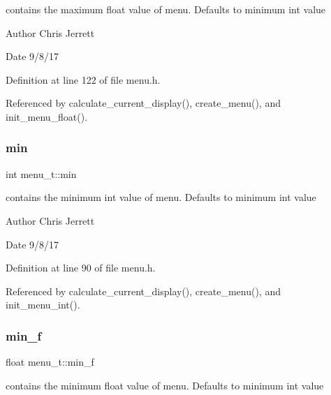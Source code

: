 contains the maximum float value of menu. Defaults to minimum int value 

\begin{DoxyAuthor}{Author}
Chris Jerrett 
\end{DoxyAuthor}
\begin{DoxyDate}{Date}
9/8/17 
\end{DoxyDate}


Definition at line 122 of file menu.\+h.



Referenced by calculate\+\_\+current\+\_\+display(), create\+\_\+menu(), and init\+\_\+menu\+\_\+float().

\mbox{\label{structmenu__t_a6891bc6c94f1e995cc62a05b13328de5}} 
\subsubsection{\texorpdfstring{min}{min}}
{\footnotesize\ttfamily int menu\+\_\+t\+::min}



contains the minimum int value of menu. Defaults to minimum int value 

\begin{DoxyAuthor}{Author}
Chris Jerrett 
\end{DoxyAuthor}
\begin{DoxyDate}{Date}
9/8/17 
\end{DoxyDate}


Definition at line 90 of file menu.\+h.



Referenced by calculate\+\_\+current\+\_\+display(), create\+\_\+menu(), and init\+\_\+menu\+\_\+int().

\mbox{\label{structmenu__t_a0a6e4f711992fb69e8a57c2af1ab7a05}} 
\subsubsection{\texorpdfstring{min\+\_\+f}{min\_f}}
{\footnotesize\ttfamily float menu\+\_\+t\+::min\+\_\+f}



contains the minimum float value of menu. Defaults to minimum int value 

